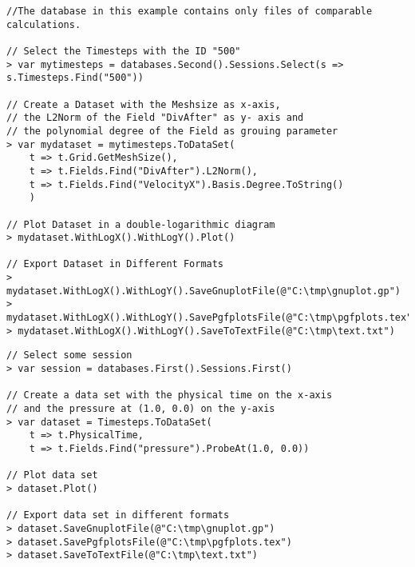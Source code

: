 \begin{lstlisting}[title=Advanced example: Exporting a Dataset]
//The database in this example contains only files of comparable calculations.

// Select the Timesteps with the ID "500"
> var mytimesteps = databases.Second().Sessions.Select(s => s.Timesteps.Find("500"))

// Create a Dataset with the Meshsize as x-axis,
// the L2Norm of the Field "DivAfter" as y- axis and
// the polynomial degree of the Field as grouing parameter
> var mydataset = mytimesteps.ToDataSet(
	t => t.Grid.GetMeshSize(),
	t => t.Fields.Find("DivAfter").L2Norm(),
	t => t.Fields.Find("VelocityX").Basis.Degree.ToString()
	)
	
// Plot Dataset in a double-logarithmic diagram
> mydataset.WithLogX().WithLogY().Plot()

// Export Dataset in Different Formats
> mydataset.WithLogX().WithLogY().SaveGnuplotFile(@"C:\tmp\gnuplot.gp")
> mydataset.WithLogX().WithLogY().SavePgfplotsFile(@"C:\tmp\pgfplots.tex")
> mydataset.WithLogX().WithLogY().SaveToTextFile(@"C:\tmp\text.txt")
\end{lstlisting}

\begin{lstlisting}[title=Advanced example: Time history in a specific point]
// Select some session
> var session = databases.First().Sessions.First()

// Create a data set with the physical time on the x-axis
// and the pressure at (1.0, 0.0) on the y-axis
> var dataset = Timesteps.ToDataSet(
	t => t.PhysicalTime,
	t => t.Fields.Find("pressure").ProbeAt(1.0, 0.0))

// Plot data set
> dataset.Plot()

// Export data set in different formats
> dataset.SaveGnuplotFile(@"C:\tmp\gnuplot.gp")
> dataset.SavePgfplotsFile(@"C:\tmp\pgfplots.tex")
> dataset.SaveToTextFile(@"C:\tmp\text.txt")
\end{lstlisting}